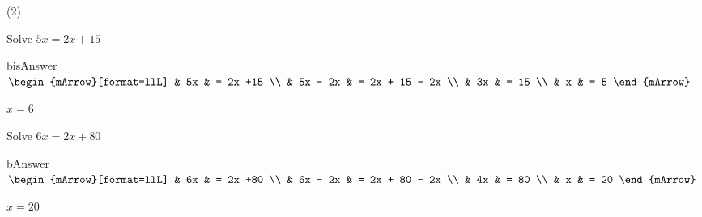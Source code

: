 \begin{mtask}(2)
   \task \begin{exercise} Solve  $ 5x  = 2x + 15 $
           \begin{envOut}{bisAnswer}
             $\begin{mArrow}[format=llL] 
			       & 5x       & = 2x +15                 \\
                   & 5x - 2x  & = 2x + 15 - 2x           \\
                   &      3x  & = 15                     \\
                   &      x  & = 5
              \end{mArrow}$
            \begin{shortsolution}  
			     $x=6$
			\end{shortsolution}				 
           \end{envOut}
         \end{exercise}
		 
   \task \begin{exercise} Solve  $ 6x  = 2x + 80 $
           \begin{envOut}{bAnswer}
             $\begin{mArrow}[format=llL] 
			       & 6x       & = 2x +80                 \\
                   & 6x - 2x  & = 2x + 80 - 2x      \\
                   &      4x  & = 80       \\
                   &      x  & = 20
              \end{mArrow}$
            \begin{shortsolution}  
			     $x=20$
			\end{shortsolution}				 
           \end{envOut}
         \end{exercise}
		 
	 
\end{mtask}
		 

